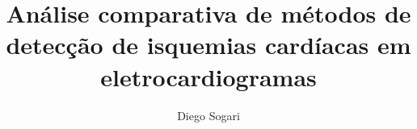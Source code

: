
\title{
    Análise comparativa de métodos de detecção de isquemias cardíacas em eletrocardiogramas
}
\author{
    Diego Sogari
}
\address{
    Instituto de Informática -- Universidade Federal do Rio Grande do Sul\\
    Caixa Postal 15.064 -- 91.501-970 -- Porto Alegre -- RS -- Brasil
}
\maketitle
